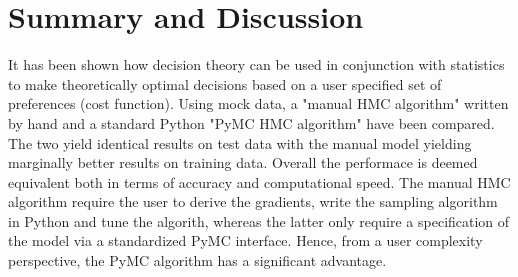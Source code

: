 \documentclass[a4paper,11pt, oneside]{article}
\theoremstyle{definition}
\begin{document}
	
	\section{Summary and Discussion}	
	It has been shown how decision theory can be used in conjunction with statistics to make theoretically optimal decisions based on a user specified set of preferences (cost function). Using mock data, a "manual HMC algorithm" written by hand and a standard Python "PyMC HMC algorithm" have been compared. The two yield identical results on test data with the manual model yielding marginally better results on training data. Overall the performace is deemed equivalent both in terms of accuracy and computational speed. The manual HMC algorithm require the user to derive the gradients, write the sampling algorithm in Python and tune the algorith, whereas the latter only require a specification of the model via a standardized PyMC interface. Hence, from a user complexity perspective, the PyMC algorithm has a significant advantage.


	
\end{document}
